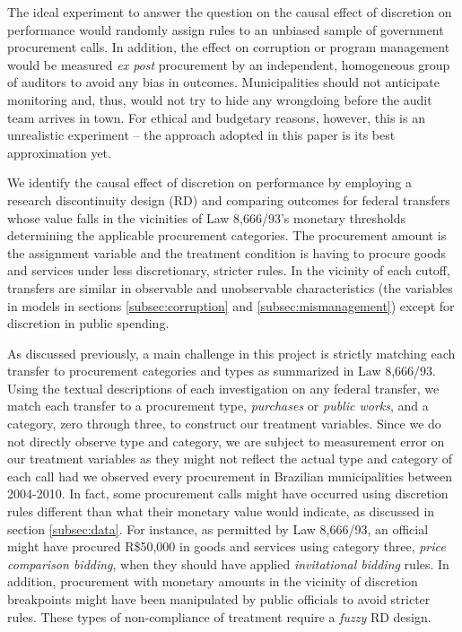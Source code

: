 \documentclass[11pt]{article}
\begin{document}
The ideal experiment to answer the question on the causal effect of discretion on performance would randomly assign rules to an unbiased sample of government procurement calls. In addition, the effect on corruption or program management would be measured \emph{ex post} procurement by an independent, homogeneous group of auditors to avoid any bias in outcomes. Municipalities should not anticipate monitoring and, thus, would not try to hide any wrongdoing before the audit team arrives in town. For ethical and budgetary reasons, however, this is an unrealistic experiment -- the approach  adopted in this paper is its best approximation yet.

We identify the causal effect of discretion on performance by employing a research discontinuity design (RD) and comparing outcomes for federal transfers whose value falls in the vicinities of Law 8,666/93's monetary thresholds determining the applicable procurement categories. The procurement amount is the assignment variable and the treatment condition is having to procure goods and services under less discretionary, stricter rules. In the vicinity of each cutoff, transfers are similar in observable and unobservable characteristics (the variables in models in sections \ref{subsec:corruption} and \ref{subsec:mismanagement}) except for discretion in public spending.

As discussed previously, a main challenge in this project is strictly matching each transfer to procurement categories and types as summarized in Law 8,666/93. Using the textual descriptions of each investigation on any federal transfer, we match each transfer to a procurement type, \emph{purchases} or \emph{public works}, and a category, zero through three, to construct our treatment variables. Since we do not directly observe type and category, we are subject to measurement error on our treatment variables as they might not reflect the actual type and category of each call had we observed every procurement in Brazilian municipalities between 2004-2010. In fact, some procurement calls might have occurred using discretion rules different than what their monetary value would indicate, as discussed in section \ref{subsec:data}. For instance, as permitted by Law 8,666/93, an official might have procured R\$50,000 in goods and services using category three, \emph{price comparison bidding}, when they should have applied \emph{invitational bidding} rules. In addition, procurement with monetary amounts in the vicinity of discretion breakpoints might have been manipulated by public officials to avoid stricter rules. These types of non-compliance of treatment require a \emph{fuzzy} RD design.
\end{document}
